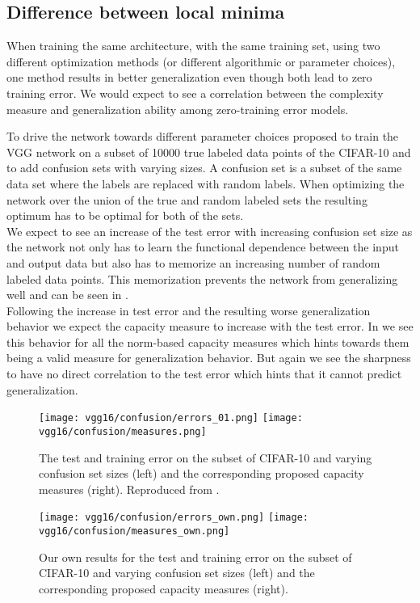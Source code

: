 \subsection{Difference between local minima}
When training the same architecture, with the same training set, using two different optimization methods (or different algorithmic or parameter choices), one method results in better generalization even though both lead to zero training error. We would
expect to see a correlation between the complexity measure and generalization ability among zero-training error models. \cite{neyshabur2017exploring} \par
%
To drive the network towards different parameter choices \cite{neyshabur2017exploring} proposed to train the VGG network \cite{simonyan2014deep} on a subset of 10000 true labeled data points of the CIFAR-10  and to add confusion sets with varying sizes. A confusion set is a subset of the same data set where the labels are replaced with random labels. When optimizing the network over the union of the true and random labeled sets the resulting optimum has to be optimal for both of the sets.\\
%
We expect to see an increase of the test error with increasing confusion set size as the network not only has to learn the functional dependence between the input and output data but also has to memorize an increasing number of random labeled data points.
This memorization prevents the network from generalizing well and can be seen in .\\
%
Following the increase in test error and the resulting worse generalization behavior we expect the capacity measure to increase with the test error. In  we see this behavior for all the norm-based capacity measures which hints towards them being a valid measure for generalization behavior. But again we see the sharpness to have no direct correlation to the test error which hints that it cannot predict generalization.
%
\begin{figure}
	\centering
	\texttt{[image: vgg16/confusion/errors\_01.png]}
	\texttt{[image: vgg16/confusion/measures.png]}
	\caption{The test and training error on the subset of CIFAR-10 and varying confusion set sizes (left) and the corresponding proposed capacity measures (right). Reproduced from \cite{neyshabur2017exploring}.}	
	\label{fig:confusion-paper}
\end{figure}
\begin{figure}
\centering
\texttt{[image: vgg16/confusion/errors\_own.png]}
\texttt{[image: vgg16/confusion/measures\_own.png]}
\caption{Our own results for the test and training error on the subset of CIFAR-10 and varying confusion set sizes (left) and the corresponding proposed capacity measures (right).}	
\label{fig:confusion-own}
\end{figure}
%
